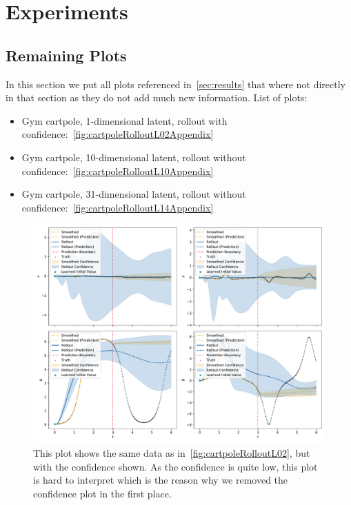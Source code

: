 \chapter{Experiments}



\section{Remaining Plots}
	\label{app:remainingPlots}

	In this section we put all plots referenced in~\autoref{sec:results} that where not directly in that section as they do not add much new information. List of plots:
	\begin{itemize}
		\item Gym cartpole, 1-dimensional latent, rollout with confidence:~\autoref{fig:cartpoleRolloutL02Appendix}
		\item Gym cartpole, 10-dimensional latent, rollout without confidence:~\autoref{fig:cartpoleRolloutL10Appendix}
		\item Gym cartpole, 31-dimensional latent, rollout without confidence:~\autoref{fig:cartpoleRolloutL14Appendix}
	\end{itemize}

	\begin{figure}
		\centering
		\includegraphics[width=\linewidth]{figures/results/cartpole-gym/run-latent-dim-02/rollout-observations-N0.pdf}
		\caption{This plot shows the same data as in~\autoref{fig:cartpoleRolloutL02}, but with the confidence shown. As the confidence is quite low, this plot is hard to interpret which is the reason why we removed the confidence plot in the first place.}
		\label{fig:cartpoleRolloutL02Appendix}
	\end{figure}


